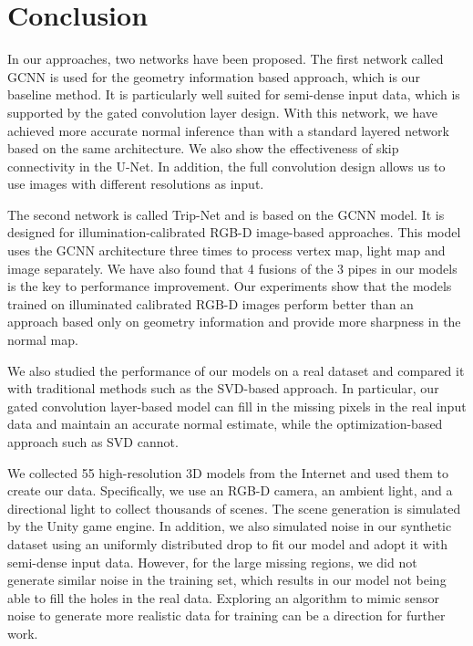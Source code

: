 
\chapter{Conclusion} %

\label{ch:06} %


In our approaches, two networks have been proposed. The first network called GCNN is used for the geometry information based approach, which is our baseline method. It is particularly well suited for semi-dense input data, which is supported by the gated convolution layer design.  With this network, we have achieved more accurate normal inference than with a standard layered network based on the same architecture. We also show the effectiveness of skip connectivity in the U-Net. In addition, the full convolution design allows us to use images with different resolutions as input. 

The second network is called Trip-Net and is based on the GCNN model. It is designed for illumination-calibrated RGB-D image-based approaches. This model uses the GCNN architecture three times to process vertex map, light map and image separately. We have also found that 4 fusions of the 3 pipes in our models is the key to performance improvement.
Our experiments show that the models trained on illuminated calibrated RGB-D images perform better than an approach based only on geometry information and provide more sharpness in the normal map.

We also studied the performance of our models on a real dataset and compared it with traditional methods such as the SVD-based approach. In particular, our gated convolution layer-based model can fill in the missing pixels in the real input data and maintain an accurate normal estimate, while the optimization-based approach such as SVD cannot. 


We collected 55 high-resolution 3D models from the Internet and used them to create our data. Specifically, we use an RGB-D camera, an ambient light, and a directional light to collect thousands of scenes. The scene generation is simulated by the Unity game engine. In addition, we also simulated noise in our synthetic dataset using an uniformly distributed drop to fit our model and adopt it with semi-dense input data.
However, for the large missing regions, we did not generate similar noise in the training set, which results in our model not being able to fill the holes in the real data. Exploring an algorithm to mimic sensor noise to generate more realistic data for training can be a direction for further work.
